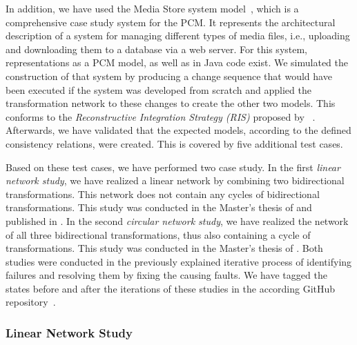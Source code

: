 In addition, we have used the Media Store system model~\cite{strittmatter2016a}, which is a comprehensive case study system for the \gls{PCM}.
It represents the architectural description of a system for managing different types of media files, i.e., uploading and downloading them to a database via a web server.
For this system, representations as a \gls{PCM} model, as well as in Java code exist.
We simulated the construction of that system by producing a change sequence that would have been executed if the system was developed from scratch and applied the transformation network to these changes to create the other two models.
This conforms to the \emph{Reconstructive Integration Strategy (RIS)} proposed by \citeauthor{langhammer2017a}~\cite{langhammer2017a,klare2020Vitruv-JSS}.
Afterwards, we have validated that the expected models, according to the defined consistency relations, were created.
This is covered by five additional test cases.

Based on these test cases, we have performed two case study.
In the first \emph{linear network study}, we have realized a linear network by combining two bidirectional transformations. This network does not contain any cycles of bidirectional transformations.
This study was conducted in the Master's thesis of \textcite{syma2018ma} and published in .
In the second \emph{circular network study}, we have realized the network of all three bidirectional transformations, thus also containing a cycle of transformations.
This study was conducted in the Master's thesis of \textcite{saglam2020ma}.
Both studies were conducted in the previously explained iterative process of identifying failures and resolving them by fixing the causing faults.
We have tagged the states before and after the iterations of these studies in the according GitHub repository~\cite{vitruvCBSEGithub}.

\subsubsection*{Linear Network Study} 

